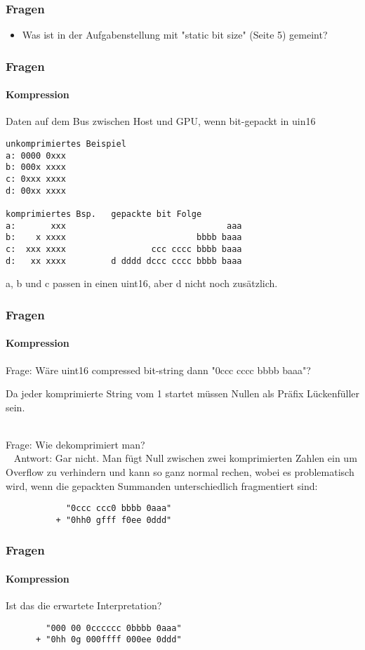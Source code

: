 \documentclass{beamer}
\begin{document}
\begin{frame}
    \frametitle{Fragen}
    \begin{itemize}
        \item Was ist in der Aufgabenstellung mit "static bit size" (Seite 5) gemeint?
    \end{itemize}
\end{frame}

\begin{frame}[fragile]
    \frametitle{Fragen}
    \framesubtitle{Kompression}
    Daten auf dem Bus zwischen Host und GPU, wenn bit-gepackt in uin16
    \begin{lstlisting}
unkomprimiertes Beispiel
a: 0000 0xxx
b: 000x xxxx
c: 0xxx xxxx
d: 00xx xxxx

komprimiertes Bsp.   gepackte bit Folge
a:       xxx                                aaa
b:    x xxxx                          bbbb baaa
c:  xxx xxxx                 ccc cccc bbbb baaa
d:   xx xxxx         d dddd dccc cccc bbbb baaa
    \end{lstlisting}
    a, b und c passen in einen uint16, aber d nicht noch zusätzlich.
\end{frame}

\begin{frame}[fragile]
    \frametitle{Fragen}
    \framesubtitle{Kompression}
    Frage: Wäre uint16 compressed bit-string dann
           "0ccc cccc bbbb baaa"?

    Da jeder komprimierte String vom 1 startet müssen Nullen als
    Präfix Lückenfüller sein.\\~

    Frage: Wie dekomprimiert man?\\~
    Antwort: Gar nicht. Man fügt Null zwischen zwei komprimierten Zahlen ein um
                        Overflow zu verhindern und kann so ganz normal rechen,
                        wobei es problematisch wird, wenn die gepackten Summanden
                        unterschiedlich fragmentiert sind:
    \begin{lstlisting}
            "0ccc ccc0 bbbb 0aaa"
          + "0hh0 gfff f0ee 0ddd"
    \end{lstlisting}
\end{frame}

\begin{frame}[fragile]
    \frametitle{Fragen}
    \framesubtitle{Kompression}
    Ist das die erwartete Interpretation?
    \begin{lstlisting}
        "000 00 0cccccc 0bbbb 0aaa"
      + "0hh 0g 000ffff 000ee 0ddd"
    \end{lstlisting}
\end{frame}

\end{document}
